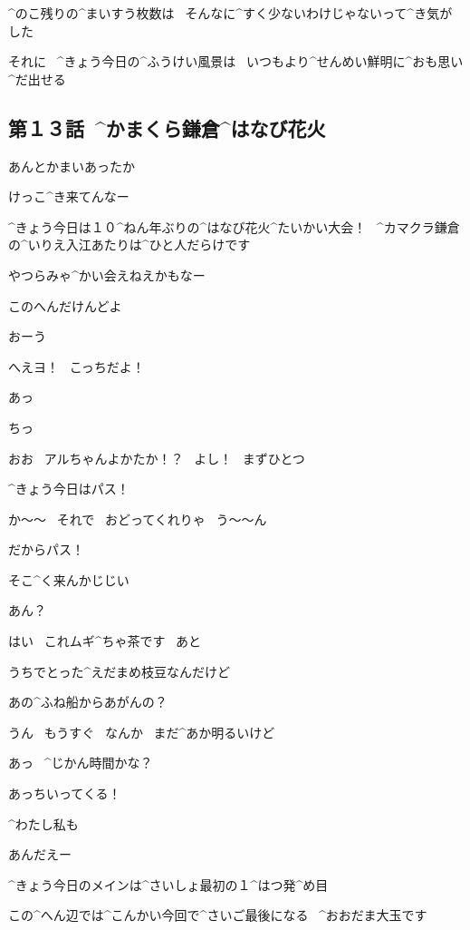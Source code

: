 \Alpha ^{のこ}{残}りの^{まいすう}{枚数}は
\ そんなに^{すく}{少}ないわけじゃないって^{き}{気}がした

\Alpha それに
\ ^{きょう}{今日}の^{ふうけい}{風景}は
\ いつもより^{せんめい}{鮮明}に^{おも}{思}い^{だ}{出}せる



\subsection{第１３話\ ^{かまくら}{鎌倉}^{はなび}{花火}}

\page[84]
\Ojisan あんとかまいあったか

\Ojisan けっこ^{き}{来}てんなー

\page
\Alpha ^{きょう}{今日}は１０^{ねん}{年}ぶりの^{はなび}{花火}^{たいかい}{大会}！
\ ^{カマクラ}{鎌倉}の^{いりえ}{入江}あたりは^{ひと}{人}だらけです

\Ojisan やつらみゃ^{かい}{会}えねえかもなー

\Ojisan このへんだけんどよ

\Person おーう

\page
\Person へえヨ！
\ こっちだよ！

\Alpha あっ

\Ojisan ちっ

\Person おお
\ アルちゃんよかたか！？
\ よし！
\ まずひとつ

\Alpha ^{きょう}{今日}はパス！

\Person か〜〜
\ それで
\ おどってくれりゃ
\ う〜〜ん

\Alpha だからパス！

\page
\Person そこ^{く}{来}んかじじい

\Ojisan あん？

\Alpha はい
\ これムギ^{ちゃ}{茶}です
\ あと

\Alpha うちでとった^{えだまめ}{枝豆}なんだけど

\Person あの^{ふね}{船}からあがんの？

\Person うん
\ もうすぐ
\ なんか
\ まだ^{あか}{明}るいけど

\page
\Alpha あっ
\ ^{じかん}{時間}かな？

\Takahiro あっちいってくる！

\Alpha ^{わたし}{私}も

\Person あんだえー

\Alpha ^{きょう}{今日}のメインは^{さいしょ}{最初}の１^{はつ}{発}^{め}{目}

\Alpha この^{へん}{辺}では^{こんかい}{今回}で^{さいご}{最後}になる
\ ^{おおだま}{大玉}です

